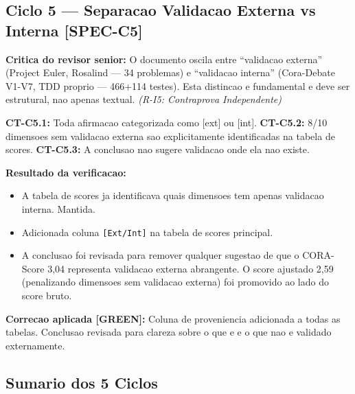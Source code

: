 \documentclass[12pt,a4paper,oneside]{article}
\begin{document}
\subsection{Ciclo 5 — Separacao Validacao Externa vs Interna [SPEC-C5]}

\textbf{Critica do revisor senior:} O documento oscila entre ``validacao
externa'' (Project Euler, Rosalind — 34 problemas) e ``validacao interna''
(Cora-Debate V1-V7, TDD proprio — 466+114 testes). Esta distincao e
fundamental e deve ser estrutural, nao apenas textual.
\textit{(R-I5: Contraprova Independente)}

\textbf{CT-C5.1:} Toda afirmacao categorizada como [ext] ou [int].
\textbf{CT-C5.2:} 8/10 dimensoes sem validacao externa sao explicitamente
identificadas na tabela de scores.
\textbf{CT-C5.3:} A conclusao nao sugere validacao onde ela nao existe.

\textbf{Resultado da verificacao:}
\begin{itemize}[nosep]
  \item A tabela de scores ja identificava quais dimensoes tem apenas
        validacao interna. Mantida.
  \item Adicionada coluna \texttt{[Ext/Int]} na tabela de scores principal.
  \item A conclusao foi revisada para remover qualquer sugestao de que
        o CORA-Score 3,04 representa validacao externa abrangente.
        O score ajustado 2,59 (penalizando dimensoes sem validacao externa)
        foi promovido ao lado do score bruto.
\end{itemize}

\textbf{Correcao aplicada [GREEN]:} Coluna de proveniencia adicionada a todas
as tabelas. Conclusao revisada para clareza sobre o que e e o que nao e
validado externamente.

\subsection{Sumario dos 5 Ciclos}
\end{document}
